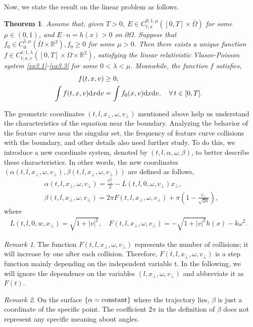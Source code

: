 \documentclass[11pt,reqno]{amsart}%
\newtheorem{Theorem}{Theorem}[section]
\theoremstyle{definition}
\theoremstyle{remark}
\newtheorem{Remark}{Remark}[section]
\begin{document}
Now, we state the result  on the  linear problem as follows.

\begin{Theorem}\label{T2}
Assume that, given $T>0$, $E\in C^{0;1,\mu}_{t;x}([0,T]\times \bar{\Omega})$ for some $\mu\in (0,1)$, and $E\cdot n=h(x)>0$ on $\partial\Omega$.
 Suppose that $f_{0}\in C^{1,\mu}_{0}(\bar{\Omega}\times \mathbb{R}^{2}), f_{0}\geq 0$
 for some $\mu > 0$.
Then there exists a unique function $f \in C^{1;1,\lambda}_{t;x,v}([0,T]\times \Omega \times \mathbb{R}^{2})$, satisfying the linear
 relativistic
Vlasov-Poisson system \eqref{vx3.1}-\eqref{vx3.3} for some $0< \lambda< \mu$. Meanwhile,  the function $f$ satisfies,
\begin{align}
f(t,x,v)&\geq 0, \label{v4.5}\\
\int f(t,x,v){\rm d}x{\rm d}v&=\int f_{0}(x,v){\rm d}x{\rm d}v, \quad \forall \, t\in[0,T]. \label{v4.6}
\end{align}
\end{Theorem}

 The geometric coordinates $(t,l,x_{\bot},\omega, v_{\bot})$ mentioned above help us understand the characteristics of the equation near the boundary. Analyzing the behavior of the feature curve near the singular set, the frequency of feature curve collisions with the boundary, and other details also need further study. To do this, we introduce a new coordinate system, denoted by $(t,l,\alpha,\omega,\beta)$, to better describe these characteristics. In other words, the   new coordinates $(\alpha(t,l,x_{\bot},\omega,v_{\bot}), \beta(t, l,  x_{\bot}, \omega, v_{\bot}))$ are defined as follows,
\begin{align}
&\alpha(t,l,x_{\bot},\omega,v_{\bot})=\frac{v_{\bot}^{2}}{2}-L(t,l,0,\omega,v_{\bot})x_{\bot},\label{v4.7}\\
&\beta(t, l,  x_{\bot}, \omega, v_{\bot})=2\pi F(t,l,x_{\bot},\omega,v_{\bot})+\pi (1-\frac{v_{\bot}}{\sqrt{2\alpha}}),\label{v4.8}
\end{align}
where
\begin{align}
L(t,l,0,w,x_{\bot})=\sqrt{1+|v|^{2}}, \quad F(t,l,x_{\bot},\omega,v_{\bot})=-\sqrt{1+|v|^{2}}h(x)-k\omega^{2}.\nonumber
\end{align}

 

\begin{Remark}
The function $F(t,l,x_{\bot},\omega,v_{\bot})$ represents the number of collisions;  it will increase by one after each collision.  Therefore,  $F(t,l,x_{\bot},\omega,v_{\bot})$ is a step function mainly depending on  the independent variable t.  In the following, we will ignore the dependence on the variables $(l,x_{\bot},\omega,v_{\bot})$ and abbreviate it as $F(t)$.

\end{Remark}
\begin{Remark}
On the surface $\{\alpha = \rm constant\} $ where the trajectory lies,  $\beta $ is just a coordinate of the specific point.
The coefficient $2\pi $ %
in the definition of $\beta$ does not represent any specific meaning about angles.
\end{Remark}
\end{document}
